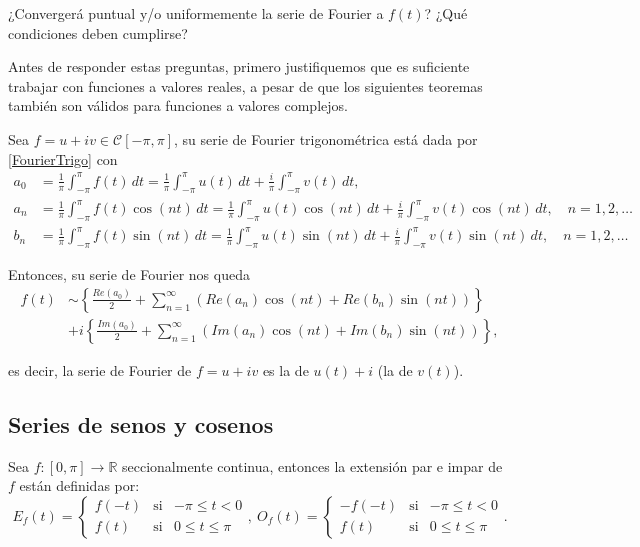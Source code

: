 ¿Convergerá puntual y/o uniformemente la serie de Fourier a $f(t)$? ¿Qué condiciones deben cumplirse?

Antes de responder estas preguntas, primero justifiquemos que es suficiente trabajar con funciones a valores reales, a pesar de que los siguientes teoremas también son válidos para funciones a valores complejos. 

Sea $f = u + iv \in \mathcal{C}[-\pi,\pi]$, su serie de Fourier trigonométrica está dada por \eqref{FourierTrigo} con 
\begin{align*}
    a_0 &= \frac{1}{\pi} \int_{-\pi}^{\pi} f(t) \,dt =  \frac{1}{\pi} \int_{-\pi}^{\pi} u(t) \,dt + \frac{i}{\pi} \int_{-\pi}^{\pi} v(t) \,dt,\\
    a_n &= \frac{1}{\pi} \int_{-\pi}^{\pi} f(t) \cos(nt) \,dt = \frac{1}{\pi} \int_{-\pi}^{\pi} u(t) \cos(nt) \,dt + \frac{i}{\pi} \int_{-\pi}^{\pi} v(t) \cos(nt) \,dt , \quad n = 1,2, \dots\\
    b_n &= \frac{1}{\pi} \int_{-\pi}^{\pi} f(t) \sin(nt) \,dt = \frac{1}{\pi} \int_{-\pi}^{\pi} u(t) \sin(nt) \,dt + \frac{i}{\pi} \int_{-\pi}^{\pi} v(t) \sin(nt) \,dt, \quad n = 1,2, \dots
\end{align*}

Entonces, su serie de Fourier nos queda
\begin{align*}
  f(t) & \sim   \left\{ \frac{Re(a_0)}{2} + \sum_{n=1}^{\infty} ( Re(a_n) \cos(nt) + Re(b_n) \sin(nt) ) \right\}  \\
   &  + i \left\{ \frac{Im(a_0)}{2} + \sum_{n=1}^{\infty} (Im(a_n) \cos(nt) + Im(b_n) \sin(nt)) \right\},
\end{align*}

es decir, la serie de Fourier de $f = u + iv$ es la de $u(t) + i$ (la de $v(t)$). 

\subsection{Series de senos y cosenos}

Sea $f:[0,\pi] \longrightarrow \mathbb{R}$ seccionalmente continua, entonces la extensión par e impar de $f$ están definidas por:
\begin{equation*}
    E_f(t) = \left\{ \begin{array}{cll}
    f(-t)     & \mbox{si} & -\pi \leq t < 0 \\
    f(t)     & \mbox{si} & 0 \leq t \leq \pi
    \end{array} \right. , ~ O_f(t) = \left\{ \begin{array}{cll}
    -f(-t)     & \mbox{si} & -\pi \leq t < 0 \\
    f(t)     & \mbox{si} & 0 \leq t \leq \pi
    \end{array} \right. .
\end{equation*}

